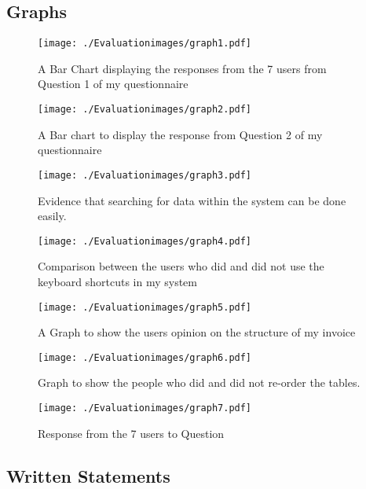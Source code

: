 \pagebreak
\subsection{Graphs}

\begin{figure}[H]
\caption{A Bar Chart displaying the responses from the 7 users from Question 1 of my questionnaire}
\hfill\texttt{[image: ./Evaluationimages/graph1.pdf]}
\end{figure}

\begin{figure}[H]
\caption{A Bar chart to display the response from Question 2 of my questionnaire}
\hfill\texttt{[image: ./Evaluationimages/graph2.pdf]}
\end{figure}

\begin{figure}[H]
\caption{Evidence that searching for data within the system can be done easily.}
\hfill\texttt{[image: ./Evaluationimages/graph3.pdf]}
\end{figure}

\begin{figure}[H]
\caption{Comparison between the users who did and did not use the keyboard shortcuts in my system}
\hfill\texttt{[image: ./Evaluationimages/graph4.pdf]}
\end{figure}

 \begin{figure}[H]
\caption{A Graph to show the users opinion on the structure of my invoice}
\hfill\texttt{[image: ./Evaluationimages/graph5.pdf]}
\end{figure}

\begin{figure}[H]
\caption{Graph to show the people who did and did not re-order the tables.}
\hfill\texttt{[image: ./Evaluationimages/graph6.pdf]}
\end{figure}

\begin{figure}[H]
\caption{Response from the 7 users to Question}
\hfill\texttt{[image: ./Evaluationimages/graph7.pdf]}
\end{figure}


\pagebreak
\subsection{Written Statements}

